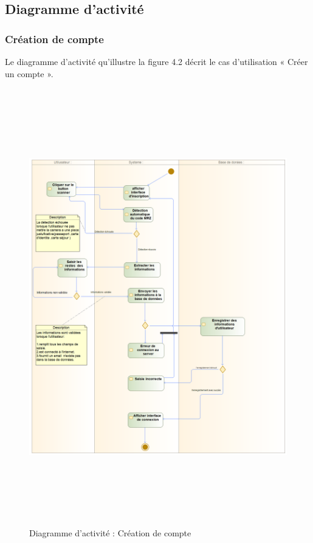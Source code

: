 \subsection{Diagramme d’activité}
\subsubsection{Création de compte}
Le diagramme d’activité qu’illustre la figure 4.2 décrit le cas d’utilisation « Créer un compte ».
\begin{figure}[h!]
	\includegraphics[width=18cm, height=19cm]{./Template LaTeX/Images/ins_act.png}
\caption{Diagramme d’activité : Création de compte}
\label{fig3:activite}
\end{figure}
\newpage
